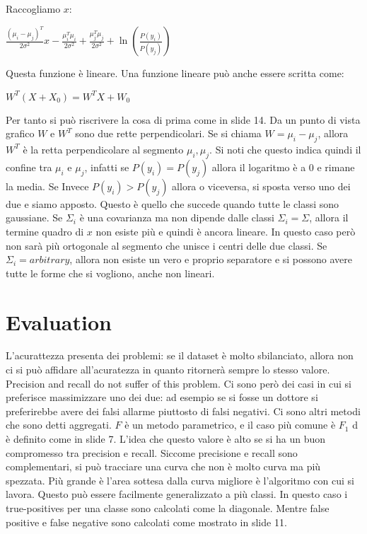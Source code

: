Raccogliamo $x$:
\begin{center}
	$\displaystyle \frac{(\mu_i-\mu_j)^T}{2\sigma^2}x-\frac{\mu_i^T\mu_i}{2\sigma^2}+\frac{\mu_j^T\mu_j}{2\sigma^2}+\ln(\frac{P(y_i)}{P(y_j)})$
\end{center}
Questa funzione è lineare. \newline
Una funzione lineare può anche essere scritta come:
\begin{center}
	$\displaystyle W^T(X+X_0)=W^TX+W_0$
\end{center}
Per tanto si può riscrivere la cosa di prima come in slide 14. Da un punto di vista grafico $W$ e $W^T$ sono due rette perpendicolari. Se si chiama $W=\mu_i-\mu_j$, allora $W^T$ è la retta perpendicolare al segmento $\mu_i, \mu_j$. Si noti che questo indica quindi il confine tra $\mu_i$ e $\mu_j$, infatti se $P(y_i)=P(y_j)$ allora il logaritmo è a 0 e rimane la media. Se Invece $P(y_i)>P(y_j)$ allora o viceversa, si sposta verso uno dei due e siamo apposto.\newline
Questo è quello che succede quando tutte le classi sono gaussiane. \newline
Se $\Sigma_i$ è una covarianza ma non dipende dalle classi $\Sigma_i=\Sigma$, allora il termine quadro di $x$ non esiste più e quindi è ancora lineare. In questo caso però non sarà più ortogonale al segmento che unisce i centri delle due classi.\newline
Se $\Sigma_i=arbitrary$, allora non esiste un vero e proprio separatore e si possono avere tutte le forme che si vogliono, anche non lineari.\newline
\section{Evaluation}
L'acurattezza presenta dei problemi: se il dataset è molto sbilanciato, allora non ci si può affidare all'acuratezza in quanto ritornerà sempre lo stesso valore. \newline
Precision and recall do not suffer of this problem. Ci sono però dei casi in cui si preferisce massimizzare uno dei due: ad esempio se si fosse un dottore si preferirebbe avere dei falsi allarme piuttosto di falsi negativi. \newline
Ci sono altri metodi che sono detti aggregati. $F$ è un metodo parametrico, e il caso più comune è $F_1$ d è definito come in slide 7. L'idea che questo valore è alto se si ha un buon compromesso tra precision e recall. \newline
Siccome precisione e recall sono complementari, si può tracciare una curva che non è molto curva ma più spezzata. Più grande è l'area sottesa dalla curva migliore è l'algoritmo con cui si lavora. \newline
Questo può essere facilmente generalizzato a più classi. In questo caso i true-positives per una classe sono calcolati come la diagonale. Mentre false positive e false negative sono calcolati come mostrato in slide 11. \newline
